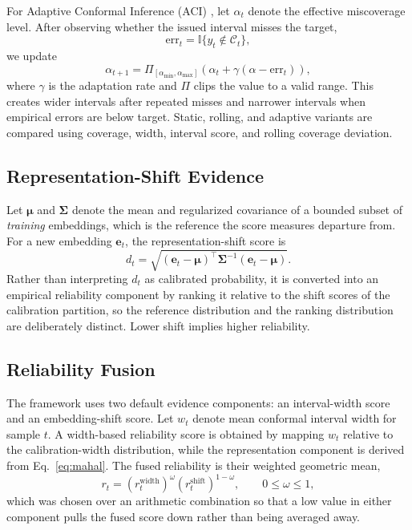 For Adaptive Conformal Inference (ACI) \cite{gibbs2021adaptive,zaffran2022adaptive}, let $\alpha_t$ denote the effective miscoverage level. After observing whether the issued interval misses the target,
\begin{equation}
\mathrm{err}_t=\mathbb{I}\{y_t\notin\mathcal{C}_t\},
\end{equation}
we update
\begin{equation}
\alpha_{t+1}=\Pi_{[\alpha_{\min},\alpha_{\max}]}
\left(\alpha_t+\gamma(\alpha-\mathrm{err}_t)\right),
\label{eq:aci}
\end{equation}
where $\gamma$ is the adaptation rate and $\Pi$ clips the value to a valid range. This creates wider intervals after repeated misses and narrower intervals when empirical errors are below target. Static, rolling, and adaptive variants are compared using coverage, width, interval score, and rolling coverage deviation.

\subsection{Representation-Shift Evidence}
Let $\boldsymbol{\mu}$ and $\boldsymbol{\Sigma}$ denote the mean and regularized covariance of a bounded subset of \emph{training} embeddings, which is the reference the score measures departure from. For a new embedding $\mathbf{e}_t$, the representation-shift score is
\begin{equation}
d_t=\sqrt{(\mathbf{e}_t-\boldsymbol{\mu})^\top\boldsymbol{\Sigma}^{-1}(\mathbf{e}_t-\boldsymbol{\mu})}.
\label{eq:mahal}
\end{equation}
Rather than interpreting $d_t$ as calibrated probability, it is converted into an empirical reliability component by ranking it relative to the shift scores of the calibration partition, so the reference distribution and the ranking distribution are deliberately distinct. Lower shift implies higher reliability.

\subsection{Reliability Fusion}
The framework uses two default evidence components: an interval-width score and an embedding-shift score. Let $w_t$ denote mean conformal interval width for sample $t$. A width-based reliability score is obtained by mapping $w_t$ relative to the calibration-width distribution, while the representation component is derived from Eq.~\eqref{eq:mahal}. The fused reliability is their weighted geometric mean,
\begin{equation}
r_t=\left(r_{t}^{\mathrm{width}}\right)^{\omega}\left(r_{t}^{\mathrm{shift}}\right)^{1-\omega},\qquad 0\leq\omega\leq1,
\label{eq:fusion}
\end{equation}
which was chosen over an arithmetic combination so that a low value in either component pulls the fused score down rather than being averaged away.

